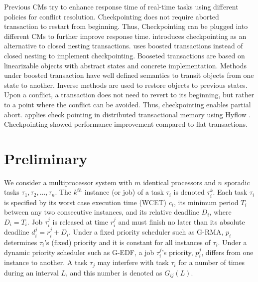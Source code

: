\documentclass[preprint]{sigplanconf}
\begin{document}
Previous CMs try to enhance response time of real-time tasks using different policies for conflict resolution. Checkpointing does not require aborted transaction to restart from beginning. Thus, Checkpointing can be plugged into different CMs to further improve response time. \cite{Koskinen:2008:CCI:1378533.1378563} introduces checkpointing as an alternative to closed nesting transactions\cite{turcu2012closed}. \cite{Koskinen:2008:CCI:1378533.1378563} uses boosted transactions \cite{Herlihy:2008:TBM:1345206.1345237} instead of closed nesting \cite{Peri:2011:CCE:1946143.1946152,turcu2012closed,6267834} to implement checkpointing. Booseted transactions are based on linearizable objects with abstract states and concrete implementation. Methods under boosted transaction have well defined semantics to transit objects from one state to another. Inverse methods are used to restore objects to previous states. Upon a conflict, a transaction does not need to revert to its beginning, but rather to a point where the conflict can be avoided. Thus, checkpointing enables partial abort. \cite{turcu_phd_proposal} applies check pointing in distributed transactional memory using Hyflow \cite{Saad:2011:HHP:1996130.1996167}. Checkpointing showed performance improvement compared to flat transactions.
%
\section{Preliminary}

We consider a multiprocessor system with $m$ identical processors and $n$ sporadic tasks $\tau_1, \tau_2,\ldots, \tau_n$. The $k^{th}$ instance (or job) of a task $\tau_i$ is denoted $\tau_i^k$. Each task $\tau_i$ is specified by its worst case execution time (WCET) $c_i$, its minimum period $T_i$ between any two consecutive instances, and its relative deadline $D_i$, where $D_i=T_i$. Job $\tau_i^j$ is released at time $r_i^j$ and must finish no later than its absolute deadline $d_i^j=r_i^j+D_i$. Under a fixed priority scheduler such as G-RMA, $p_i$ determines $\tau_i$'s (fixed) priority and it is constant for all instances of $\tau_i$. Under a dynamic priority scheduler such as G-EDF, a job $\tau_i^j$'s priority, $p_i^j$, differs from one instance to another. 
A task $\tau_j$ may interfere with task $\tau_i$ for a number of times during an interval $L$, and this number is denoted as $G_{ij}(L)$. 
\end{document}
